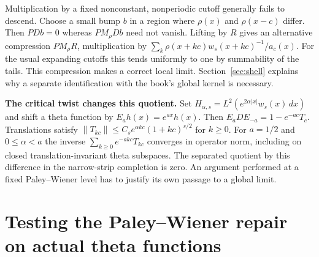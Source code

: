 \documentclass[11pt,letterpaper]{article}
\newcommand{\head}[1]{\par\smallskip\textbf{#1}\enspace}
\begin{document}
Multiplication by a fixed nonconstant, nonperiodic cutoff generally fails to descend. Choose a small bump $b$ in a region where $\rho(x)$ and $\rho(x-c)$ differ. Then $PDb=0$ whereas $P M_\rho Db$ need not vanish. Lifting by $R$ gives an alternative compression $P M_\rho R$, multiplication by $\sum_k \rho(x+kc)w_s(x+kc)^{-1}/a_c(x)$. For the usual expanding cutoffs this tends uniformly to one by summability of the tails. This compression makes a correct local limit. Section~\ref{sec:shell} explains why a separate identification with the book's global kernel is necessary.

\head{The critical twist changes this quotient.}
Set $H_{\alpha,s}=L^2(e^{2\alpha|x|}w_s(x)\,dx)$ and shift a theta function by $E_a h(x)=e^{ax}h(x)$. Then $E_a D E_{-a}=1-e^{-ac}T_c$. Translations satisfy $\|T_{kc}\|\le C_s e^{\alpha kc}(1+kc)^{s/2}$ for $k\ge0$. For $a=1/2$ and $0\le\alpha<a$ the inverse $\sum_{k\ge0} e^{-akc}T_{kc}$ converges in operator norm, including on closed translation-invariant theta subspaces. The separated quotient by this difference in the narrow-strip completion is zero. An argument performed at a fixed Paley--Wiener level has to justify its own passage to a global limit.

\section{Testing the Paley--Wiener repair on actual theta functions}\label{sec:pw}
\end{document}
